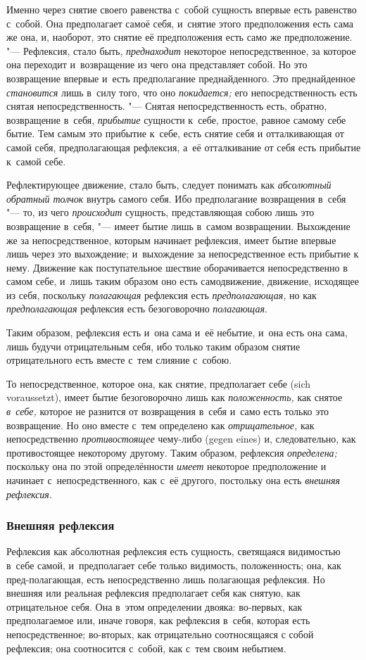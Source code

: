 Именно через снятие своего равенства с~собой сущность впервые есть равенство
с~собой. Она предполагает самоё себя, и~снятие этого предположения есть
сама же она, и, наоборот, это снятие её предположения есть само же
предположение. "--- Рефлексия, стало быть,
{\em преднаходит} некоторое непосредственное, за
которое она переходит и~возвращение из чего она представляет собой. Но это
возвращение впервые и~есть предполагание преднайденного. Это преднайденное
{\em становится} лишь в~силу того, что оно
{\em покидается;} его непосредственность есть снятая
непосредственность. "--- Снятая непосредственность есть, обратно, возвращение
в~себя, {\em прибытие} сущности к~себе, простое, равное
самому себе бытие. Тем самым это прибытие к~себе, есть снятие себя и
отталкивающая от самой себя, предполагающая рефлексия, а~её отталкивание от
себя есть прибытие к~самой себе.

Рефлектирующее движение, стало быть, следует понимать как
{\em абсолютный обратный толчок} внутрь самого себя.
Ибо предполагание возвращения в~себя "--- то, из чего
{\em происходит} сущность, представляющая собою лишь
это возвращение в~себя, "--- имеет бытие лишь в~самом возвращении. Выхождение
же за непосредственное, которым начинает рефлексия, имеет бытие впервые
лишь через это выхождение; и~выхождение за непосредственное есть прибытие к
нему. Движение как поступательное шествие оборачивается непосредственно в
самом себе, и~лишь таким образом оно есть самодвижение, движение, исходящее
из себя, поскольку {\em полагающая} рефлексия есть
{\em предполагающая,} но как
{\em предполагающая} рефлексия есть безоговорочно
{\em полагающая}.

Таким образом, рефлексия есть и~она сама и~её небытие, и~она есть она сама,
лишь будучи отрицательным себя, ибо только таким образом снятие
отрицательного есть вместе с~тем слияние с~собою.

То непосредственное, которое она, как снятие, предполагает себе (sich
voraussetzt), имеет бытие безоговорочно лишь как
{\em положенность,} как снятое
{\em в~себе,} которое не разнится от возвращения в~себя
и~само есть только это возвращение. Но оно вместе с~тем определено как
{\em отрицательное,} как непосредственно
{\em противостоящее} чему-либо (gegen eines) и,
следовательно, как противостоящее некоторому другому. Таким образом,
рефлексия {\em определена;} поскольку она по этой
определённости {\em имеет} некоторое предположение и
начинает с~непосредственного, как с~её другого, постольку она есть
{\em внешняя рефлексия}.

\subsubsection{Внешняя рефлексия}
Рефлексия как абсолютная рефлексия есть
сущность, светящаяся видимостью в~себе самой, и~предполагает себе только
видимость, положенность; она, как пред-полагающая, есть непосредственно
лишь полагающая рефлексия. Но внешняя или реальная рефлексия предполагает
себя как снятую, как отрицательное себя. Она в~этом определении двояка:
во-первых, как предполагаемое или, иначе говоря, как рефлексия в~себя,
которая есть непосредственное; во-вторых, как отрицательно соотносящаяся с
собой рефлексия; она соотносится с~собой, как с~тем своим небытием.

